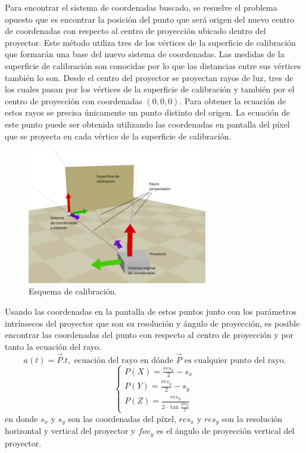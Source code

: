 Para encontrar el sistema de coordenadas buscado, se resuelve el problema opuesto que es encontrar la posición del punto que será origen del nuevo centro de coordenadas con respecto al centro de proyección ubicado dentro del proyector. Este método utiliza tres de los vértices de la superficie de calibración que formarán una base del nuevo sistema de coordenadas. Las medidas de la superficie de calibración son conocidas por lo que las distancias entre sus vértices también lo son. Desde el centro del proyector se proyectan rayos de luz, tres de los cuales pasan por los vértices de la superficie de calibración y también por el centro de proyección con coordenadas $(0, 0, 0)$. Para obtener la ecuación de estos rayos se precisa únicamente un punto distinto del origen. La ecuación de este punto puede ser obtenida utilizando las coordenadas en pantalla del píxel que se proyecta en cada vértice de la superficie de calibración.

\begin{figure}[H]
  \centering
    \includegraphics[width=0.7\textwidth]{./Cap2_videomapping/CalibrationSketch}
  \caption{Esquema de calibración.}
  \label{fig:CalibrationSketch}
\end{figure}

Usando las coordenadas en la pantalla de estos puntos junto con los parámetros intrínsecos del proyector que son su resolución y ángulo de proyección, es posible encontrar las coordenadas del punto con respecto al centro de proyección y por tanto la ecuación del rayo.
\[
a(t) = \vec{P} . t,	\mbox{ ecuación del rayo en dónde } \vec{P} \mbox{ es cualquier punto del rayo.}
\]
\[
\begin{cases}
P(X) = \frac{res_x}{2} - s_x \\
P(Y) = \frac{res_y}{2} - s_y \\
P(Z) = \frac{res_y}{2 \cdot \tan \frac{fov_y}{2}}
\end{cases}
\]
en donde $s_x$ y $s_y$ son las coordenadas del píxel, $res_x$ y $res_y$ son la resolución horizontal y vertical del proyector y $fov_y$ es el ángulo de proyección vertical del proyector.

